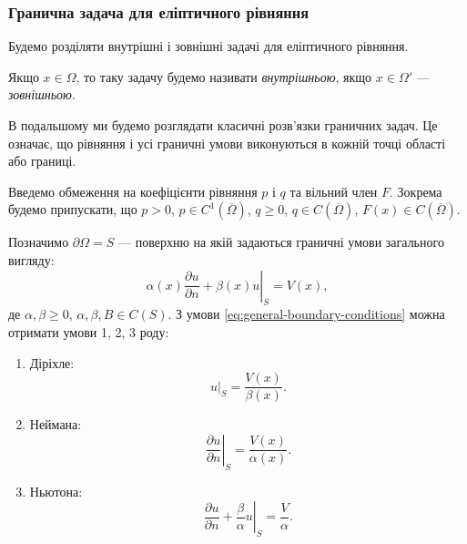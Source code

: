 \subsubsection{Гранична задача для еліптичного рівняння}

Будемо розділяти внутрішні і зовнішні задачі для еліптичного рівняння.

\begin{definition}
    Якщо $x \in \Omega$, то таку задачу будемо називати \textit{внутрішньою}, якщо $x \in \Omega'$ ---  \textit{зовнішньою}.
\end{definition}

\begin{remark}
    В подальшому ми будемо розглядати класичні розв'язки граничних задач. Це означає, що рівняння і усі граничні умови виконуються в кожній точці області або границі.
\end{remark}

Введемо обмеження на коефіцієнти рівняння $p$ і $q$ та вільний член $F$. Зокрема будемо припускати, що $p > 0$, $p \in C^1 \left(\overline \Omega\right)$, $q \ge 0$, $q \in C \left(\overline \Omega\right)$, $F(x) \in C \left(\overline \Omega\right)$. \medskip

Позначимо $\partial \Omega = S$ --- поверхню на якій задаються граничні умови загального
вигляду:
\begin{equation}
    \label{eq:general-boundary-conditions}
    \left. \alpha(x) \frac{\partial u}{\partial n} + \beta(x) u \right|_S = V(x),
\end{equation}
де $\alpha, \beta \ge 0$, $\alpha, \beta, B \in C(S)$. З умови \eqref{eq:general-boundary-conditions} можна отримати умови 1, 2, 3 роду:
\begin{enumerate}
    \item Діріхле:
    \begin{equation}
        \label{eq:elliptic-dirichlet-boundary-conditions}
        \left. u \right|_S = \frac{V(x)}{\beta(x)}.
    \end{equation}
    \item Неймана:
    \begin{equation}
        \label{eq:elliptic-neumann-boundary-conditions}
        \left. \frac{\partial u}{\partial n} \right|_S = \frac{V(x)}{\alpha(x)}.
    \end{equation}
    \item Ньютона:
    \begin{equation}
        \label{eq:elliptic-newton-boundary-conditions}
        \left. \frac{\partial u}{\partial n} + \frac{\beta}{\alpha} u \right|_S = \frac{V}{\alpha}.
    \end{equation}
\end{enumerate}

